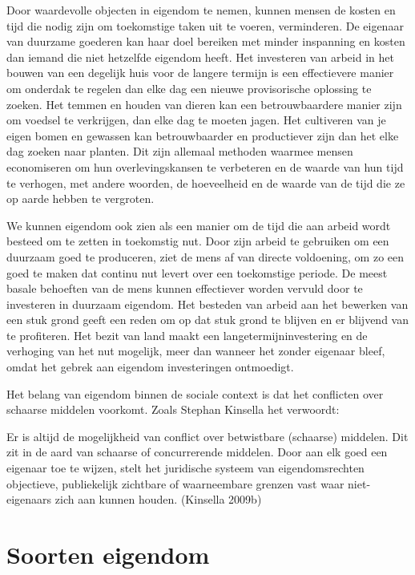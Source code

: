 \documentclass[
  a5paper,
  smalldemyvopaper,11pt,twoside,onecolumn,openright,extrafontsizes,
hidelinks]{memoir}
\begin{document}
Door waardevolle objecten in eigendom te nemen, kunnen mensen de kosten
en tijd die nodig zijn om toekomstige taken uit te voeren, verminderen.
De eigenaar van duurzame goederen kan haar doel bereiken met minder
inspanning en kosten dan iemand die niet hetzelfde eigendom heeft. Het
investeren van arbeid in het bouwen van een degelijk huis voor de
langere termijn is een effectievere manier om onderdak te regelen dan
elke dag een nieuwe provisorische oplossing te zoeken. Het temmen en
houden van dieren kan een betrouwbaardere manier zijn om voedsel te
verkrijgen, dan elke dag te moeten jagen. Het cultiveren van je eigen
bomen en gewassen kan betrouwbaarder en productiever zijn dan het elke
dag zoeken naar planten. Dit zijn allemaal methoden waarmee mensen
economiseren om hun overlevingskansen te verbeteren en de waarde van hun
tijd te verhogen, met andere woorden, de hoeveelheid en de waarde van de
tijd die ze op aarde hebben te vergroten.

We kunnen eigendom ook zien als een manier om de tijd die aan arbeid
wordt besteed om te zetten in toekomstig nut. Door zijn arbeid te
gebruiken om een duurzaam goed te produceren, ziet de mens af van
directe voldoening, om zo een goed te maken dat continu nut levert over
een toekomstige periode. De meest basale behoeften van de mens kunnen
effectiever worden vervuld door te investeren in duurzaam eigendom. Het
besteden van arbeid aan het bewerken van een stuk grond geeft een reden
om op dat stuk grond te blijven en er blijvend van te profiteren. Het
bezit van land maakt een langetermijninvestering en de verhoging van het
nut mogelijk, meer dan wanneer het zonder eigenaar bleef, omdat het
gebrek aan eigendom investeringen ontmoedigt.

Het belang van eigendom binnen de sociale context is dat het conflicten
over schaarse middelen voorkomt. Zoals Stephan Kinsella het verwoordt:

Er is altijd de mogelijkheid van conflict over betwistbare (schaarse)
middelen. Dit zit in de aard van schaarse of concurrerende middelen.
Door aan elk goed een eigenaar toe te wijzen, stelt het juridische
systeem van eigendomsrechten objectieve, publiekelijk zichtbare of
waarneembare grenzen vast waar niet-eigenaars zich aan kunnen houden.
(Kinsella 2009b)

\section{Soorten eigendom}\label{soorten-eigendom}
\end{document}
